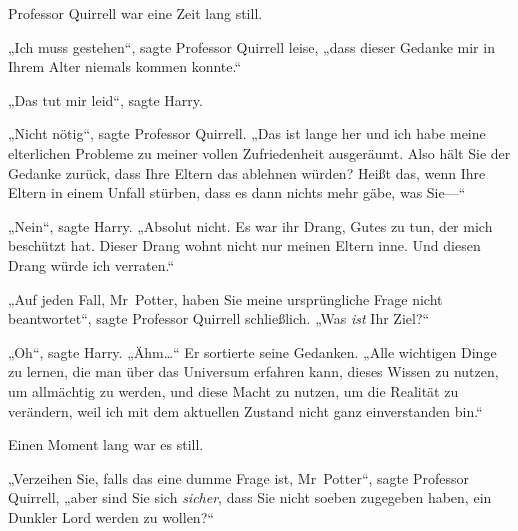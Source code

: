 Professor Quirrell war eine Zeit lang still.

„Ich muss gestehen“, sagte Professor Quirrell leise, „dass dieser Gedanke mir in Ihrem Alter niemals kommen konnte.“

„Das tut mir leid“, sagte Harry.

„Nicht nötig“, sagte Professor Quirrell. „Das ist lange her und ich habe meine elterlichen Probleme zu meiner vollen Zufriedenheit ausgeräumt. Also hält Sie der Gedanke zurück, dass Ihre Eltern das ablehnen würden? Heißt das, wenn Ihre Eltern in einem Unfall stürben, dass es dann nichts mehr gäbe, was Sie—“

„Nein“, sagte Harry. „Absolut nicht. Es war ihr Drang, Gutes zu tun, der mich beschützt hat. Dieser Drang wohnt nicht nur meinen Eltern inne. Und diesen Drang würde ich verraten.“

„Auf jeden Fall, Mr~Potter, haben Sie meine ursprüngliche Frage nicht beantwortet“, sagte Professor Quirrell schließlich. „Was \emph{ist} Ihr Ziel?“

„Oh“, sagte Harry. „Ähm…“ Er sortierte seine Gedanken. „Alle wichtigen Dinge zu lernen, die man über das Universum erfahren kann, dieses Wissen zu nutzen, um allmächtig zu werden, und diese Macht zu nutzen, um die Realität zu verändern, weil ich mit dem aktuellen Zustand nicht ganz einverstanden bin.“

Einen Moment lang war es still.

„Verzeihen Sie, falls das eine dumme Frage ist, Mr~Potter“, sagte Professor Quirrell, „aber sind Sie sich \emph{sicher}, dass Sie nicht soeben zugegeben haben, ein Dunkler Lord werden zu wollen?“

